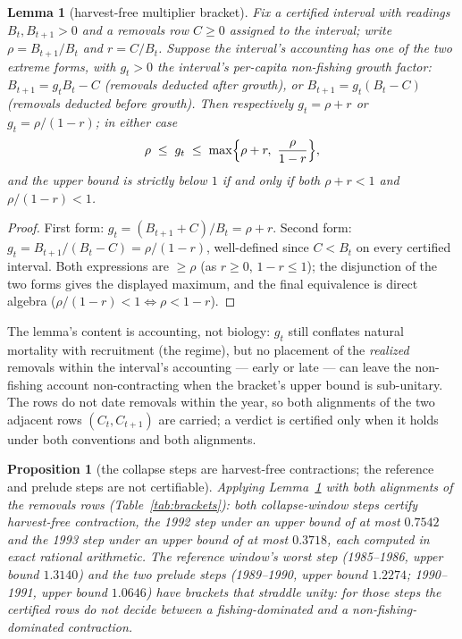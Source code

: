 \documentclass[10pt,twocolumn]{article}
\theoremstyle{plain}
\newtheorem{lemma}[theorem]{Lemma}
\newtheorem{proposition}[theorem]{Proposition}
\theoremstyle{remark}
\begin{document}
\begin{lemma}[harvest-free multiplier bracket]\label{lem:bracket}
Fix a certified interval with readings \(B_t, B_{t+1} > 0\) and a
removals row \(C \ge 0\) assigned to the interval; write
\(\rho = B_{t+1}/B_t\) and \(r = C/B_t\). Suppose the interval's
accounting has one of the two extreme forms, with \(g_t > 0\) the
interval's per-capita non-fishing growth factor:
\(B_{t+1} = g_t B_t - C\) (removals deducted after growth), or
\(B_{t+1} = g_t (B_t - C)\) (removals deducted before growth). Then
respectively \(g_t = \rho + r\) or \(g_t = \rho/(1-r)\); in either
case
\[
\rho \;\le\; g_t \;\le\; \max\Bigl\{\rho + r,\ \frac{\rho}{1-r}\Bigr\},
\]
and the upper bound is strictly below \(1\) if and only if both
\(\rho + r < 1\) and \(\rho/(1-r) < 1\).
\end{lemma}

\begin{proof}
First form: \(g_t = (B_{t+1} + C)/B_t = \rho + r\). Second form:
\(g_t = B_{t+1}/(B_t - C) = \rho/(1 - r)\), well-defined since
\(C < B_t\) on every certified interval. Both expressions are
\(\ge \rho\) (as \(r \ge 0\), \(1 - r \le 1\)); the disjunction of the
two forms gives the displayed maximum, and the final equivalence is
direct algebra (\(\rho/(1-r) < 1 \iff \rho < 1 - r\)).
\end{proof}

The lemma's content is accounting, not biology: \(g_t\) still conflates
natural mortality with recruitment (the regime), but no placement of
the \emph{realized} removals within the interval's accounting --- early
or late --- can leave the non-fishing account non-contracting when the
bracket's upper bound is sub-unitary. The rows do not date removals
within the year, so both alignments of the two adjacent rows
\((C_t, C_{t+1})\) are carried; a verdict is certified only when it
holds under both conventions and both alignments.

\begin{proposition}[the collapse steps are harvest-free contractions;
the reference and prelude steps are not certifiable]
\label{prop:brackets}
Applying Lemma~\ref{lem:bracket} with both alignments of the removals
rows (Table~\ref{tab:brackets}): both collapse-window steps certify
harvest-free contraction, the 1992 step under an upper bound of at
most \(0.7542\) and the 1993 step under an upper bound of at most
\(0.3718\), each computed in exact rational arithmetic. The reference
window's worst step (1985--1986, upper bound \(1.3140\)) and the two
prelude steps (1989--1990, upper bound \(1.2274\); 1990--1991, upper
bound \(1.0646\)) have brackets that straddle unity: for those steps
the certified rows do not decide between a fishing-dominated and a
non-fishing-dominated contraction.
\end{proposition}
\end{document}
